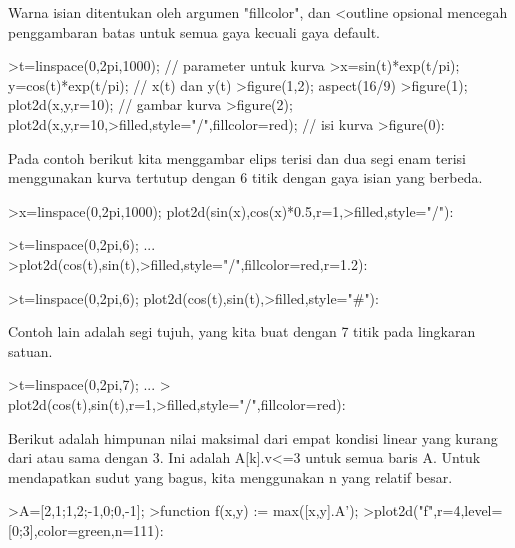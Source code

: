 \documentclass[a4paper,10pt]{article}
\begin{document}
\begin{eulernotebook}
\begin{eulercomment}
\begin{eulercomment}
\begin{eulercomment}
\begin{eulercomment}
\begin{eulercomment}
\begin{eulercomment}
\begin{eulercomment}
Warna isian ditentukan oleh argumen "fillcolor", dan \textless{}outline opsional mencegah
penggambaran batas untuk semua gaya kecuali gaya default.
\end{eulercomment}
\begin{eulerprompt}
>t=linspace(0,2pi,1000); // parameter untuk kurva
>x=sin(t)*exp(t/pi); y=cos(t)*exp(t/pi); // x(t) dan y(t)
>figure(1,2); aspect(16/9)
>figure(1); plot2d(x,y,r=10); // gambar kurva
>figure(2); plot2d(x,y,r=10,>filled,style="/",fillcolor=red); // isi kurva
>figure(0):
\end{eulerprompt}
\begin{eulercomment}
Pada contoh berikut kita menggambar elips terisi dan dua segi enam terisi menggunakan
kurva tertutup dengan 6 titik dengan gaya isian yang berbeda.
\end{eulercomment}
\begin{eulerprompt}
>x=linspace(0,2pi,1000); plot2d(sin(x),cos(x)*0.5,r=1,>filled,style="/"):
\end{eulerprompt}
\begin{eulerprompt}
>t=linspace(0,2pi,6); ...
>plot2d(cos(t),sin(t),>filled,style="/",fillcolor=red,r=1.2):
\end{eulerprompt}
\begin{eulerprompt}
>t=linspace(0,2pi,6); plot2d(cos(t),sin(t),>filled,style="#"):
\end{eulerprompt}
\begin{eulercomment}
Contoh lain adalah segi tujuh, yang kita buat dengan 7 titik pada lingkaran satuan.
\end{eulercomment}
\begin{eulerprompt}
>t=linspace(0,2pi,7);  ...
> plot2d(cos(t),sin(t),r=1,>filled,style="/",fillcolor=red):
\end{eulerprompt}
\begin{eulercomment}
Berikut adalah himpunan nilai maksimal dari empat kondisi linear yang kurang dari atau
sama dengan 3. Ini adalah A[k].v\textless{}=3 untuk semua baris A. Untuk mendapatkan sudut yang
bagus, kita menggunakan n yang relatif besar.
\end{eulercomment}
\begin{eulerprompt}
>A=[2,1;1,2;-1,0;0,-1];
>function f(x,y) := max([x,y].A');
>plot2d("f",r=4,level=[0;3],color=green,n=111):

\end{eulerprompt}
\end{eulercomment}
\end{eulercomment}
\end{eulercomment}
\end{eulercomment}
\end{eulercomment}
\end{eulercomment}
\end{eulernotebook}
\end{document}
